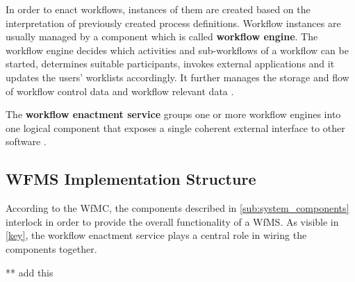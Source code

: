     In order to enact workflows, instances of them are created based on the interpretation of previously created process definitions. Workflow instances are usually managed by a component which is called \textbf{workflow engine}. The workflow engine decides which activities and sub-workflows of a workflow can be started, determines suitable participants, invokes external applications and it updates the users' worklists accordingly. It further manages the storage and flow of workflow control data and workflow relevant data \cite{Hollingsworth1995WfMC}.

    The \textbf{workflow enactment service} groups one or more workflow engines into one logical component that exposes a single coherent external interface to other software \cite{Hollingsworth1995WfMC}.

  \subsection{WFMS Implementation Structure} %
  \label{sub:wfms_implementation_structure}
    According to the \ac{WfMC}, the components described in \ref{sub:system_components} interlock in order to provide the overall functionality of a \ac{WfMS}. As visible in \ref{key}, the workflow enactment service plays a central role in wiring the components together.

    ** add this

